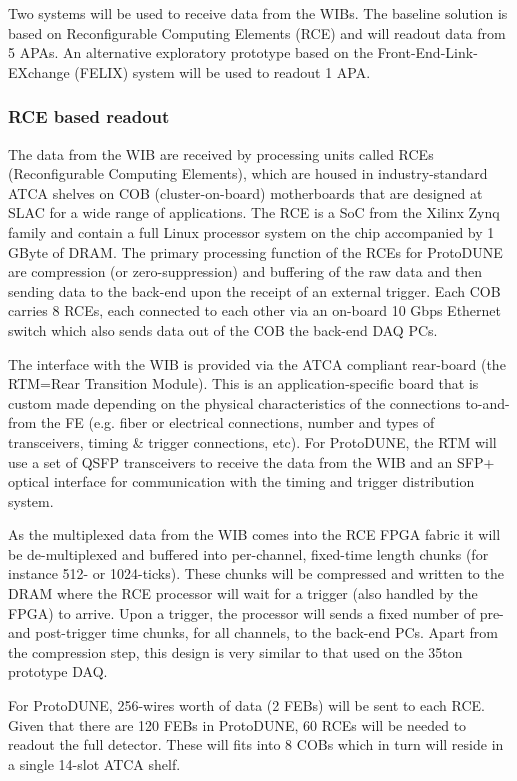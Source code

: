 Two systems will be used to receive data from the WIBs.  The baseline
solution is based on Reconfigurable Computing Elements (RCE) and will
readout data from 5 APAs.  An alternative exploratory prototype based on
the Front-End-Link-EXchange (FELIX) system will be used to readout 1 APA.

\subsubsection{RCE based readout}
The data from the WIB are received by processing units called RCEs
(Reconfigurable Computing Elements), which are housed in industry-standard
ATCA shelves on COB (cluster-on-board) motherboards that are designed
at SLAC for a wide range of applications.   The RCE is a SoC from the
Xilinx Zynq family and contain a full Linux processor system on the chip
accompanied by 1 GByte of DRAM.   The primary processing function of the
RCEs for ProtoDUNE are compression (or zero-suppression) and buffering
of the raw data and then sending data to the back-end upon the receipt of
an external trigger.  Each COB carries 8 RCEs, each connected to each
other via an on-board 10 Gbps Ethernet switch which also sends data out
of the COB the back-end DAQ PCs.

The interface with the WIB is provided via the ATCA compliant rear-board
(the RTM=Rear Transition Module).  This is an application-specific board
that is custom made depending on the physical characteristics of the
connections to-and-from the FE (e.g. fiber or electrical connections,
number and types of transceivers, timing \& trigger connections, etc).
For ProtoDUNE, the RTM will use a set of QSFP transceivers to receive
the data from the WIB and an SFP+ optical interface for communication
with the timing and trigger distribution system.

As the multiplexed data from the WIB comes into the RCE FPGA fabric
it will be de-multiplexed and buffered into per-channel, fixed-time
length chunks (for instance 512- or 1024-ticks).  These chunks will be
compressed and written to the DRAM where the RCE processor will wait
for a trigger (also handled by the FPGA) to arrive.  Upon a trigger, the
processor will sends a fixed number of pre- and post-trigger time chunks,
for all channels, to the back-end PCs.  Apart from the compression step,
this design is very similar to that used on the 35ton prototype DAQ.

For ProtoDUNE, 256-wires worth of data (2 FEBs) will be sent to each RCE.
Given that there are 120 FEBs in ProtoDUNE, 60 RCEs will be needed to
readout the full detector.  These will fits into 8 COBs which in turn
will reside in a single 14-slot ATCA shelf.

